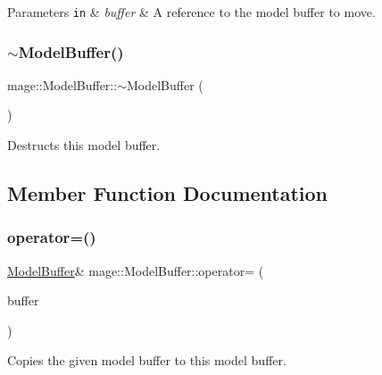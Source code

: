 \begin{DoxyParams}[1]{Parameters}
\mbox{\tt in}  & {\em buffer} & A reference to the model buffer to move. \\
\hline
\end{DoxyParams}
\hypertarget{structmage_1_1_model_buffer_a9536832e39a72cc597c41ca245eb52ba}{}\label{structmage_1_1_model_buffer_a9536832e39a72cc597c41ca245eb52ba} 
\subsubsection{\texorpdfstring{$\sim$\+Model\+Buffer()}{~ModelBuffer()}}
{\footnotesize\ttfamily mage\+::\+Model\+Buffer\+::$\sim$\+Model\+Buffer (\begin{DoxyParamCaption}{ }\end{DoxyParamCaption})\hspace{0.3cm}{\ttfamily [default]}}

Destructs this model buffer. 

\subsection{Member Function Documentation}
\hypertarget{structmage_1_1_model_buffer_a003f2105c63f3d7e735c1c00bab5fdee}{}\label{structmage_1_1_model_buffer_a003f2105c63f3d7e735c1c00bab5fdee} 
\subsubsection{\texorpdfstring{operator=()}{operator=()}\hspace{0.1cm}{\footnotesize\ttfamily [1/2]}}
{\footnotesize\ttfamily \hyperlink{structmage_1_1_model_buffer}{Model\+Buffer}\& mage\+::\+Model\+Buffer\+::operator= (\begin{DoxyParamCaption}\item[{const \hyperlink{structmage_1_1_model_buffer}{Model\+Buffer} \&}]{buffer }\end{DoxyParamCaption})\hspace{0.3cm}{\ttfamily [default]}}

Copies the given model buffer to this model buffer.


